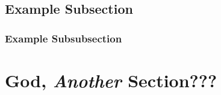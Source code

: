 \Blindtext

\subsection{Example Subsection}

\blindtext


\subsubsection{Example Subsubsection}

\blindtext

\section{God, \emph{Another} Section??? }


